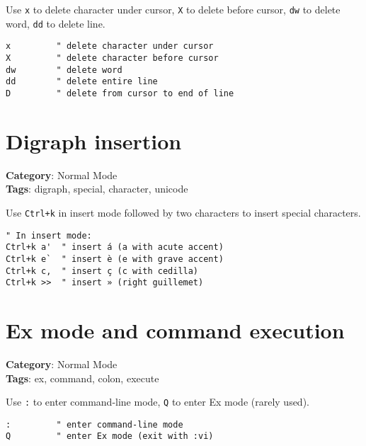 {{{{{{{{{{Use {\footnotesize \Verb§x§} to delete character under cursor, {\footnotesize \Verb§X§} to delete before cursor, {\footnotesize \Verb§dw§} to delete word, {\footnotesize \Verb§dd§} to delete line.

\begin{Exa*}{}
\begin{Verbatim}[fontsize=\footnotesize, breaklines, breakanywhere]
x         " delete character under cursor
X         " delete character before cursor
dw        " delete word
dd        " delete entire line
D         " delete from cursor to end of line
\end{Verbatim}
\end{Exa*}

\section{Digraph insertion}

\textbf{Category}: Normal Mode\\ \textbf{Tags}: digraph, special, character, unicode
\vspace{0.5cm}

Use {\footnotesize \Verb§Ctrl+k§} in insert mode followed by two characters to insert special characters.

\begin{Exa*}{}
\begin{Verbatim}[fontsize=\footnotesize, breaklines, breakanywhere]
" In insert mode:
Ctrl+k a'  " insert á (a with acute accent)
Ctrl+k e`  " insert è (e with grave accent)
Ctrl+k c,  " insert ç (c with cedilla)
Ctrl+k >>  " insert » (right guillemet)
\end{Verbatim}
\end{Exa*}

\section{Ex mode and command execution}

\textbf{Category}: Normal Mode\\ \textbf{Tags}: ex, command, colon, execute
\vspace{0.5cm}

Use {\footnotesize \Verb§:§} to enter command-line mode, {\footnotesize \Verb§Q§} to enter Ex mode (rarely used).

\begin{Exa*}{}
\begin{Verbatim}[fontsize=\footnotesize, breaklines, breakanywhere]
:         " enter command-line mode
Q         " enter Ex mode (exit with :vi)
\end{Verbatim}
\end{Exa*}

}}}}}}}}}}
